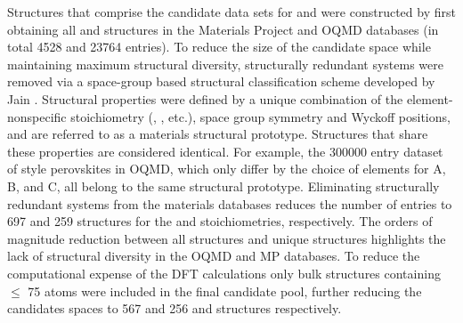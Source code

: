 %
%
Structures that comprise the candidate data sets for \IrOtwo and \IrOthree were constructed by first obtaining all \ABtwo and \ABthree structures in the Materials Project\cite{Jain2013} and OQMD\cite{Kirklin2015} databases
(in total \num{4528} \ABtwo and \num{23764} \ABthree entries).
%
To reduce the size of the candidate space while maintaining maximum structural diversity, structurally redundant systems were removed via a space-group based structural classification scheme developed by Jain  \cite{Jain2018}.
Structural properties were defined by a unique combination of the element-nonspecific stoichiometry (\ABtwo, \ABthree, etc.), space group symmetry and Wyckoff positions, and are referred to as a materials structural prototype.
%
Structures that share these properties are considered identical.
%
For example, the \num{300000} entry dataset of \ABOthree style perovskites in OQMD, which only differ by the choice of elements for A, B, and C, all belong to the same structural prototype.
%
Eliminating structurally redundant systems from the materials databases reduces the number of entries to \num{697} and \num{259} structures for the \ABtwo and \ABthree stoichiometries, respectively.
%
The orders of magnitude reduction between all structures and unique structures highlights the lack of structural diversity in the OQMD and MP databases.
%
To reduce the computational expense of the DFT calculations only bulk structures containing $\leq$ \num{75} atoms were included in the final candidate pool, further reducing the candidates spaces to \num{567} and \num{256} \ABtwo and \ABthree structures respectively.
%

